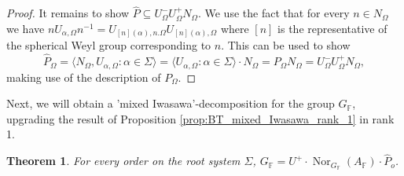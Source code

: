 \documentclass[12pt]{amsart}
\newcommand{\F}{\mathbb{F} }
\numberwithin{equation}{section}
\newtheorem{theorem}{Theorem}[section]
\theoremstyle{remark} %
\begin{document}
\begin{proof}
			It remains to show $\hat{P} \subseteq U_\Omega^- U_{\Omega}^+ N_\Omega$. We use the fact that for every $n \in N_\Omega$ we have $n U_{\alpha,\Omega} n^{-1} = U_{[n](\alpha),n.\Omega} U_{[n](\alpha), \Omega}$ where $[n]$ is the representative of the spherical Weyl group corresponding to $n$. This can be used to show
			$$
			\hat{P}_\Omega = \langle N_\Omega, U_{\alpha,\Omega} \colon \alpha \in \Sigma \rangle = \langle U_{\alpha, \Omega} \colon \alpha \in \Sigma \rangle \cdot N_\Omega = P_\Omega N_\Omega = U_\Omega^- U_\Omega^+ N_\Omega, 
			$$ 
			making use of the description of $P_\Omega$.
		\end{proof}
		
		Next, we will obtain a 'mixed Iwasawa'-decomposition for the group $G_\F$, upgrading the result of Proposition \ref{prop:BT_mixed_Iwasawa_rank_1} in rank 1.
		\begin{theorem}\label{thm:BT_mixed_Iwasawa}
			For every order on the root system $\Sigma$,
			$G_\F = U^+ \cdot \operatorname{Nor}_{G_\F}(A_\F) \cdot \hat{P}_o$.
		\end{theorem}
\end{document}
